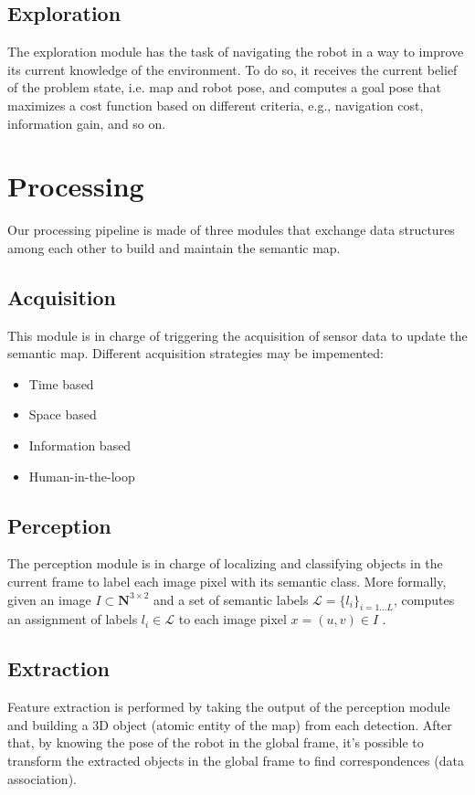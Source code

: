 \documentclass{article}
\begin{document}
	\subsection*{Exploration}
	
	The exploration module has the task of navigating the robot in a way to improve its current knowledge of the environment. To do so, it receives the current belief of the problem state, i.e. map and robot pose, and computes a goal pose that maximizes a cost function based on different criteria, e.g., navigation cost, information gain, and so on.
	
	\section*{Processing}
	
	Our processing pipeline is made of three modules that exchange data structures among each other to build and maintain the semantic map.
	
	\subsection*{Acquisition}
	
	This module is in charge of triggering the acquisition of sensor data to update the semantic map. Different acquisition strategies may be impemented:
	
	\begin{itemize}
		\item Time based
		\item Space based
		\item Information based
		\item Human-in-the-loop
	\end{itemize}
	
	\subsection*{Perception}
	
	The perception module is in charge of localizing and classifying objects in the current frame to label each image pixel with its semantic class. More formally, given an image $I \subset \mathbf{N}^{3 \times 2}$ and a set of semantic labels $\mathcal{L} = \{l_i\}_{i=1 \dots L}$, computes an assignment of labels $l_i \in \mathcal{L}$ to each image pixel $x = (u,v) \in I$ .
	
	\subsection*{Extraction}
	
	Feature extraction is performed by taking the output of the perception module and building a 3D object (atomic entity of the map) from each detection. After that, by knowing the pose of the robot in the global frame, it's possible to transform the extracted objects in the global frame to find correspondences (data association).
	
	

	
\end{document}
